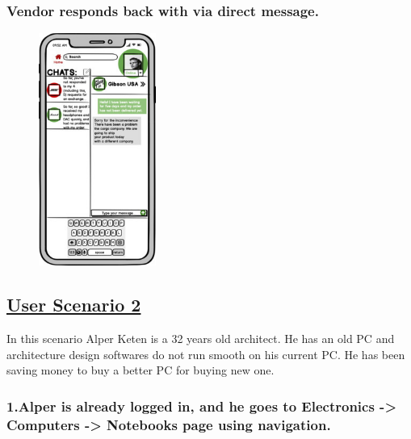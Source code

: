 \documentclass[]{article}
\begin{document}
\hypertarget{vendor-responds-back-with-via-direct-message.}{%
    \subsubsection{Vendor responds back with via direct
        message.}\label{vendor-responds-back-with-via-direct-message.}}

\begin{figure}[H]
    \centering
    \includegraphics[height=3in]{./images/24.jpg}
\end{figure}

\pagebreak
\hypertarget{user-scenario-2}{%
    \subsection{\texorpdfstring{\href{https://github.com/bounswe/bounswe2020group2/wiki/User-Scenario-\%232---Purchase}{User
                Scenario 2}}{User Scenario 2}}\label{user-scenario-2}}

In this scenario Alper Keten is a 32 years old architect. He has an old
PC and architecture design softwares do not run smooth on his current
PC. He has been saving money to buy a better PC for buying new one.

\hypertarget{alper-is-already-logged-in-and-he-goes-to-electronics---computers---notebooks-page-using-navigation.}{%
    \subsubsection{1.Alper is already logged in, and he goes to Electronics
        -\textgreater{} Computers -\textgreater{} Notebooks page using
        navigation.}\label{alper-is-already-logged-in-and-he-goes-to-electronics---computers---notebooks-page-using-navigation.}}
\end{document}
